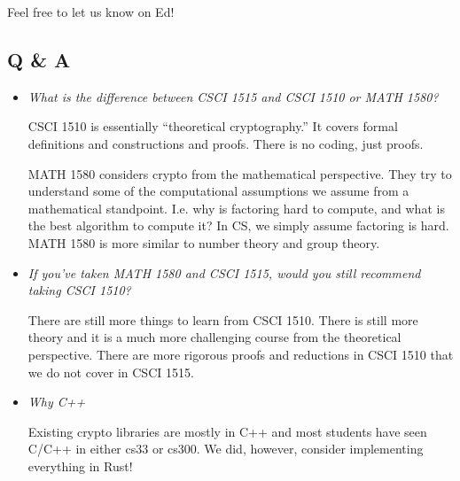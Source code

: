 Feel free to let us know on Ed!

\subsection{Q \& A}

\begin{itemize}
    \item \emph{What is the difference between CSCI 1515 and CSCI 1510 or MATH 1580?}
    
    CSCI 1510 is essentially ``theoretical cryptography.'' It covers formal definitions and constructions and proofs. There is no coding, just proofs.

    MATH 1580 considers crypto from the mathematical perspective. They try to understand some of the computational assumptions we assume from a mathematical standpoint. I.e. why is factoring hard to compute, and what is the best algorithm to compute it? In CS, we simply assume factoring is hard. MATH 1580 is more similar to number theory and group theory.

    \item \emph{If you've taken MATH 1580 and CSCI 1515, would you still recommend taking CSCI 1510?}
    
    There are still more things to learn from CSCI 1510. There is still more theory and it is a much more challenging course from the theoretical perspective. There are more rigorous proofs and reductions in CSCI 1510 that we do not cover in CSCI 1515.

    \item \emph{Why C++}

    Existing crypto libraries are mostly in C++ and most students have seen C/C++ in either cs33 or cs300. We did, however, consider implementing everything in Rust!
\end{itemize}
